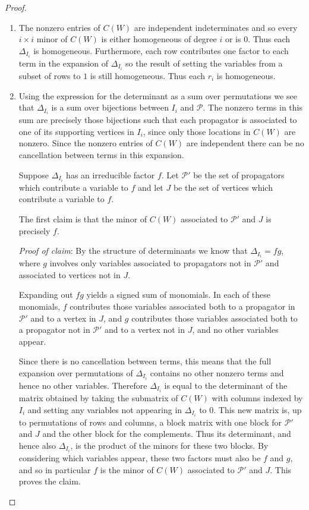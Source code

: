 \documentclass[11pt]{article}
\theoremstyle{remark}
\theoremstyle{definition}
\begin{document}
\begin{proof}
\begin{enumerate}
    \item The nonzero entries of $C(W)$ are independent indeterminates and so every $i\times i$ minor of $C(W)$ is either homogeneous of degree $i$ or is $0$.  Thus each $\Delta_{I_i}$ is homogeneous.  Furthermore, each row contributes one factor to each term in the expansion of $\Delta_{I_i}$ so the result of setting the variables from a subset of rows to $1$ is still homogeneous.  Thus each $r_i$ is homogeneous.
    \item Using the expression for the determinant as a sum over permutations we see that $\Delta_{I_i}$ is a sum over bijections between $I_i$ and $\mathcal{P}$.  The nonzero terms in this sum are precisely those bijections such that each propagator is associated to one of its supporting vertices in $I_i$, since only those locations in $C(W)$ are nonzero.  Since the nonzero entries of $C(W)$ are independent there can be no cancellation between terms in this expansion.

Suppose $\Delta_{I_i}$ has an irreducible factor $f$.  Let $\mathcal{P}'$ be the set of propagators which contribute a variable to $f$ and let $J$ be the set of vertices which contribute a variable to $f$.

The first claim is that the minor of $C(W)$ associated to $\mathcal{P}'$ and $J$ is precisely $f$.

{\em Proof of claim}: By the structure of determinants we know that $\Delta_{I_i} = fg$, where $g$ involves only variables associated to propagators not in $\mathcal{P}'$ and associated to vertices not in $J$.  

Expanding out $fg$ yields a signed sum of monomials. In each of these monomials, $f$ contributes those variables associated both to a propagator in $\mathcal{P}'$ and to a vertex in $J$, and $g$ contributes those variables associated both to a propagator not in $\mathcal{P}'$ and to a vertex not in $J$, and no other variables appear.  


Since there is no cancellation between terms, this means that the full expansion over permutations of $\Delta_{I_i}$ contains no other nonzero terms and hence no other variables.  Therefore $\Delta_{I_i}$ is equal to the determinant of the matrix obtained by taking the submatrix of $C(W)$ with columns indexed by $I_i$ and setting any variables not appearing in $\Delta_{I_i}$ to $0$.  This new matrix is, up to permutations of rows and columns, a block matrix with one block for $\mathcal{P}'$ and $J$ and the other block for the complements.  Thus its determinant, and hence also $\Delta_{I_i}$, is the product of the minors for these two blocks.  By considering which variables appear, these two factors must also be $f$ and $g$, and so in particular $f$ is the minor of $C(W)$ associated to $\mathcal{P}'$ and $J$.  This proves the claim.


\end{enumerate}
\end{proof}
\end{document}
